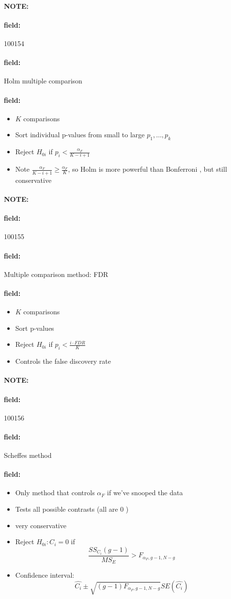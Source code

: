 \documentclass[12pt]{article}
\newenvironment{note}{\paragraph{NOTE:}}{}
\newenvironment{field}{\paragraph{field:}}{}
\begin{document}
\begin{note}
 \begin{field}
  \tiny 100154
 \end{field}
 \begin{field}
  Holm multiple comparison
 \end{field}
 \begin{field}
  \begin{itemize}
   \item $K$ comparisons
   \item Sort individual p-values from small to large $p_1, \ldots, p_k$
   \item Reject $H_{0i}$ if $p_i < \frac{\alpha_F}{K-i+1}$
   \item Note $\frac{\alpha_F}{K-i+1} \geq \frac{\alpha_F}{K}$, so Holm is more powerful than Bonferroni , but still conservative
  \end{itemize}
 \end{field}
\end{note}

\begin{note}
 \begin{field}
  \tiny 100155
 \end{field}
 \begin{field}
  Multiple comparison method: FDR
 \end{field}
 \begin{field}
  \begin{itemize}
   \item $K$ comparisons
   \item Sort p-values
   \item Reject $H_{0i}$ if $p_i < \frac{i \cdot FDR}{K}$
   \item Controls the false discovery rate
  \end{itemize}
 \end{field}
\end{note}



\begin{note}
 \begin{field}
  \tiny 100156
 \end{field}
 \begin{field}
  Scheffes method
 \end{field}
 \begin{field}
  \begin{itemize}
   \item Only method that controls $\alpha_F$ if we've snooped the data
   \item Tests all possible contrasts (all are 0 )
   \item very conservative
   \item Reject $H_{0i}: C_i = 0$ if $$\frac{SS_{C_i}(g-1)}{MS_E} > F_{\alpha_F, g-1, N-g} $$
   \item Confidence interval: $$\hat{C_i} \pm \sqrt{(g-1)F_{\alpha_F, g-1, N-g}}SE(\hat{C_i}) $$
  \end{itemize}
 \end{field}
\end{note}
\end{document}

